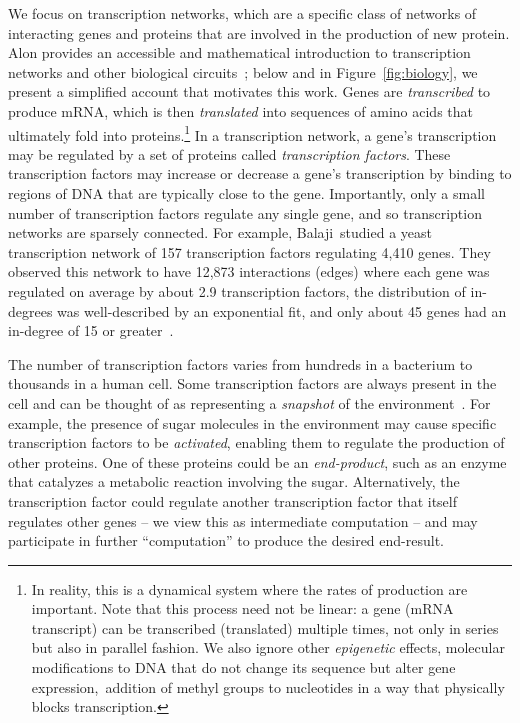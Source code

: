 We focus on transcription networks, which are a specific class of networks of
interacting genes and proteins that are involved in the production of new
protein. Alon provides an accessible and mathematical introduction to
transcription networks and other biological circuits~\cite{Alon:2006}; below and
in Figure~\ref{fig:biology}, we present a simplified account that motivates this
work. Genes are \emph{transcribed} to produce mRNA, which is then
\emph{translated} into sequences of amino acids that ultimately fold into
proteins.\footnote{In reality, this is a dynamical system where the rates of
production are important. Note that this process need not be linear: a gene (mRNA
transcript) can be transcribed (translated) multiple times, not only in series
but also in parallel fashion.  We also ignore
other \emph{epigenetic} effects, \ie molecular modifications to DNA that do not
change its sequence but alter gene expression,~\eg addition of methyl groups to
nucleotides in a way that physically blocks transcription.}
In a transcription network, a gene's transcription may be regulated by a set of
proteins called \emph{transcription factors}.
These transcription factors may increase or decrease a gene's transcription by
binding to regions of DNA that are typically close to the gene.
Importantly, only a small number of transcription factors
regulate any single gene, and so transcription networks are sparsely connected.
For example, Balaji~\etal studied a yeast
transcription network of 157 transcription factors regulating 4,410 genes. They
observed this network to have 12,873 interactions (edges) where each gene was
regulated on average by about 2.9 transcription factors, the distribution of
in-degrees was well-described by an exponential fit, and only about 45 genes had
an in-degree of 15 or greater~\cite{Balaji:2006}.

The number of transcription factors varies from hundreds in a bacterium to
thousands in a human cell. Some transcription factors are always present in the
cell and can be thought of as representing a \emph{snapshot} of the
environment~\cite{Alon:2006}.
For example, the presence of sugar molecules in the environment may cause
specific transcription factors to be \emph{activated}, enabling them to regulate
the production of other proteins.  One of these proteins could be an
\emph{end-product}, such as an enzyme that catalyzes a metabolic reaction
involving the sugar. Alternatively, the transcription factor could regulate
another transcription factor that itself
regulates other genes -- we view this as intermediate computation -- and may
participate in further ``computation'' to produce the desired end-result.

